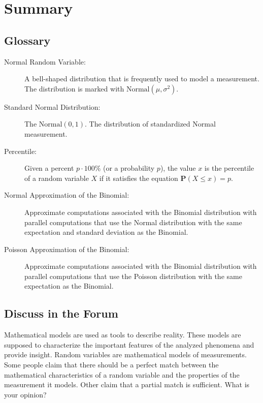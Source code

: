 \documentclass[]{krantz}
\newcommand{\Prob}{\mathbf{P}}
\theoremstyle{definition}
\theoremstyle{definition}
\theoremstyle{definition}
\theoremstyle{remark}
\begin{document}
\hypertarget{summary-5}{%
\section{Summary}\label{summary-5}}

\hypertarget{glossary}{%
\subsection*{Glossary}\label{glossary}}


\begin{description}
\item[Normal Random Variable:]
A bell-shaped distribution that is frequently used to model a
measurement. The distribution is marked with
\(\mathrm{Normal}(\mu,\sigma^2)\).
\item[Standard Normal Distribution:]
The \(\mathrm{Normal}(0,1)\). The distribution of standardized Normal
measurement.
\item[Percentile:]
Given a percent \(p \cdot 100\%\) (or a probability \(p\)), the value
\(x\) is the percentile of a random variable \(X\) if it satisfies the
equation \(\Prob(X \leq x) = p\).
\item[Normal Approximation of the Binomial:]
Approximate computations associated with the Binomial distribution
with parallel computations that use the Normal distribution with the
same expectation and standard deviation as the Binomial.
\item[Poisson Approximation of the Binomial:]
Approximate computations associated with the Binomial distribution
with parallel computations that use the Poisson distribution with
the same expectation as the Binomial.
\end{description}

\hypertarget{discuss-in-the-forum}{%
\subsection*{Discuss in the Forum}\label{discuss-in-the-forum}}


Mathematical models are used as tools to describe reality. These models
are supposed to characterize the important features of the analyzed
phenomena and provide insight. Random variables are mathematical models
of measurements. Some people claim that there should be a perfect match
between the mathematical characteristics of a random variable and the
properties of the measurement it models. Other claim that a partial
match is sufficient. What is your opinion?
\end{document}
